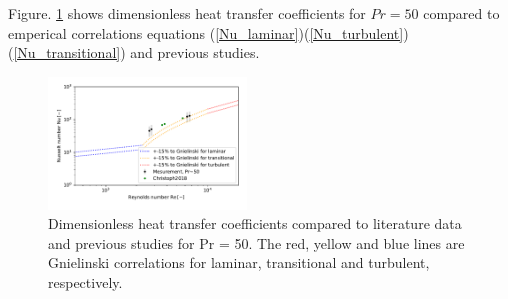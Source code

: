 \documentclass[conference]{IEEEtran}
\begin{document}
\newpage
Figure. \ref{renu_pr50} shows dimensionless heat transfer coefficients for $Pr=50$ compared to emperical correlations equations (\ref{Nu_laminar})(\ref{Nu_turbulent})(\ref{Nu_transitional}) and previous studies.
\begin{figure}[htbp]
  \centering
  \vspace{5zh}
  \includegraphics[width=0.47\textwidth,natwidth=400,natheight=200]{fig/renu_pr50.pdf}
  \vspace{-1.5zh}
  \caption{Dimensionless heat transfer coefficients compared to literature data and previous studies for Pr = 50. The red, yellow and blue lines are Gnielinski correlations for laminar, transitional and turbulent, respectively.}
  \label{renu_pr50}
\end{figure}\\
\end{document}
